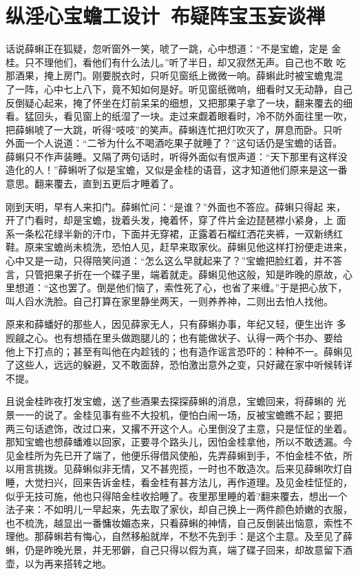 \chapter{纵淫心宝蟾工设计~布疑阵宝玉妄谈禅}

话说薛蝌正在狐疑，忽听窗外一笑，唬了一跳，心中想道：“不是宝蟾，定是
金桂。只不理他们，看他们有什么法儿。”听了半日，却又寂然无声。自己也不敢
吃那酒果，掩上房门。刚要脱衣时，只听见窗纸上微微一响。薛蝌此时被宝蟾鬼混
了一阵，心中七上八下，竟不知如何是好。听见窗纸微响，细看时又无动静，自己
反倒疑心起来，掩了怀坐在灯前呆呆的细想，又把那果子拿了一块，翻来覆去的细
看。猛回头，看见窗上的纸湿了一块。走过来觑着眼看时，冷不防外面往里一吹，
把薛蝌唬了一大跳，听得“吱吱”的笑声。薛蝌连忙把灯吹灭了，屏息而卧。只听
外面一个人说道：“二爷为什么不喝酒吃果子就睡了？”这句话仍是宝蟾的话音。
薛蝌只不作声装睡。又隔了两句话时，听得外面似有恨声道：“天下那里有这样没
造化的人！”薛蝌听了似是宝蟾，又似是金桂的语音，这才知道他们原来是这一番
意思。翻来覆去，直到五更后才睡着了。

刚到天明，早有人来扣门。薛蝌忙问：“是谁？”外面也不答应。薛蝌只得起
来，开了门看时，却是宝蟾，拢着头发，掩着怀，穿了件片金边琵琶襟小紧身，上
面系一条松花绿半新的汗巾，下面并无穿裙，正露着石榴红洒花夹裤，一双新绣红
鞋。原来宝蟾尚未梳洗，恐怕人见，赶早来取家伙。薛蝌见他这样打扮便走进来，
心中又是一动，只得陪笑问道：“怎么这么早就起来了？”宝蟾把脸红着，并不答
言，只管把果子折在一个碟子里，端着就走。薛蝌见他这般，知是昨晚的原故，心
里想道：“这也罢了。倒是他们恼了，索性死了心，也省了来缠。”于是把心放下，
叫人舀水洗脸。自己打算在家里静坐两天，一则养养神，二则出去怕人找他。

原来和薛蟠好的那些人，因见薛家无人，只有薛蝌办事，年纪又轻，便生出许
多觊觎之心。也有想插在里头做跑腿儿的；也有能做状子、认得一两个书办、要给
他上下打点的；甚至有叫他在内趁钱的；也有造作谣言恐吓的：种种不一。薛蝌见
了这些人，远远的躲避，又不敢面辞，恐怕激出意外之变，只好藏在家中听候转详
不提。

且说金桂昨夜打发宝蟾，送了些酒果去探探薛蝌的消息，宝蟾回来，将薛蝌的
光景一一的说了。金桂见事有些不大投机，便怕白闹一场，反被宝蟾瞧不起；要把
两三句话遮饰，改过口来，又撂不开这个人。心里倒没了主意，只是怔怔的坐着。
那知宝蟾也想薛蟠难以回家，正要寻个路头儿，因怕金桂拿他，所以不敢透漏。今
见金桂所为先已开了端了，他便乐得借风使船，先弄薛蝌到手，不怕金桂不依，所
以用言挑拨。见薛蝌似非无情，又不甚兜揽，一时也不敢造次。后来见薛蝌吹灯自
睡，大觉扫兴，回来告诉金桂，看金桂有甚方法儿，再作道理。及见金桂怔怔的，
似乎无技可施，他也只得陪金桂收拾睡了。夜里那里睡的着?翻来覆去，想出一个
法子来：不如明儿一早起来，先去取了家伙，却自己换上一两件颜色娇嫩的衣服，
也不梳洗，越显出一番慵妆媚态来，只看薛蝌的神情，自己反倒装出恼意，索性不
理他。那薛蝌若有悔心，自然移船就岸，不愁不先到手：是这个主意。及至见了薛
蝌，仍是昨晚光景，并无邪僻，自己只得以假为真，端了碟子回来，却故意留下酒
壶，以为再来搭转之地。

